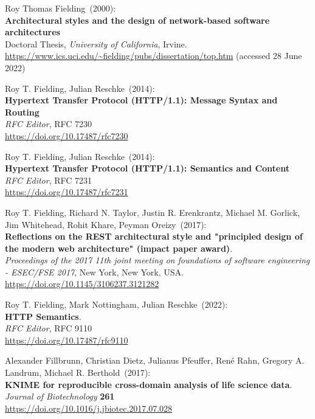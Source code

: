 \begin{thebibliography}{9}
Roy Thomas Fielding~(2000): \\
\textbf{Architectural styles and the design of network-based software architectures}\\
Doctoral Thesis, 
\emph{University of California}, Irvine.\\
\url{https://www.ics.uci.edu/~fielding/pubs/dissertation/top.htm}
(accessed 28 June 2022) 

Roy T. Fielding, Julian Reschke~(2014): \\
\textbf{Hypertext {Transfer Protocol} ({HTTP}/1.1): {Message Syntax} and {Routing}}\\
\emph{RFC Editor}, RFC 7230 \\
\url{https://doi.org/10.17487/rfc7230}

Roy T. Fielding, Julian Reschke~(2014): \\
\textbf{Hypertext {Transfer Protocol} ({HTTP}/1.1): {Semantics} and {Content}} \\
\emph{RFC Editor}, RFC 7231 \\
\url{https://doi.org/10.17487/rfc7231}

Roy T. Fielding, Richard N. Taylor, Justin R. Erenkrantz, Michael M. Gorlick, Jim Whitehead, Rohit Khare, Peyman Oreizy~(2017): \\
\textbf{Reflections on the {REST} architectural style and "principled
design of the modern web architecture" (impact paper award)}. \\
\emph{Proceedings of the 2017 11th joint meeting on foundations of software engineering - {ESEC}/{FSE} 2017}, New York, New York, USA.\\
\url{https://doi.org/10.1145/3106237.3121282}

Roy T. Fielding, Mark Nottingham, Julian Reschke~(2022): \\
\textbf{HTTP Semantics}.\\
\emph{RFC Editor}, RFC 9110\\
\url{https://doi.org/10.17487/rfc9110}

Alexander Fillbrunn, Christian Dietz, Julianus Pfeuffer, René Rahn, Gregory A. Landrum, Michael R. Berthold~(2017): \\
\textbf{KNIME for reproducible cross-domain analysis of life science data}.\\
\emph{Journal of Biotechnology} \textbf{261}\\
\url{https://doi.org/10.1016/j.jbiotec.2017.07.028}


\end{thebibliography}
